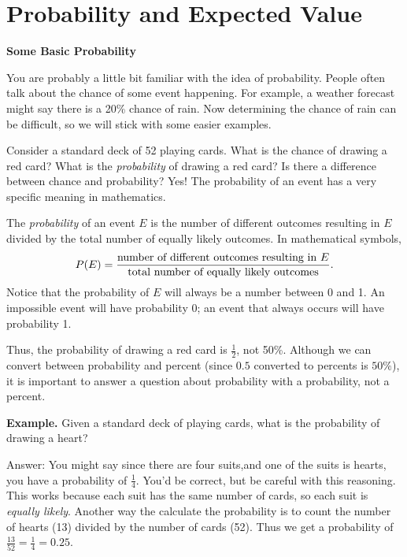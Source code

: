 
\section{Probability and Expected Value}



\noindent
{\bf Some Basic Probability}
\vspace{.1in}

You are probably a little bit familiar with the idea of probability. People often talk about the chance of some event happening. For example, a weather forecast might say there is a 20\% chance of rain. Now determining the chance of rain can be difficult, so we will stick with some easier examples. 

Consider a standard deck of 52 playing cards. What is the chance of drawing a red card? What is the {\it probability} of drawing a red card? Is there a difference between chance and probability? Yes! The probability of an event has a very specific meaning in mathematics. 

The {\it probability} of an event $E$ is the number of different outcomes resulting in $E$ divided by the total number of equally likely outcomes. In mathematical symbols, 
$$P(E)={\mbox{number of different outcomes resulting in $E$}\over \mbox{total number of equally likely outcomes}}.$$
Notice that the probability of $E$ will always be a number between 0 and 1. An impossible event will have probability 0;   an event that always occurs will have probability 1.
\vspace{.1in}

Thus, the probability of drawing a red card is $\frac{1}{2}$, not 50\%. Although we can convert between probability and percent (since $0.5$ converted to percents is $50\%$), it is important to answer a question about probability with a probability, not a percent. 

\vspace{.1in}
{\bf Example.} Given a standard deck of playing cards, what is the probability of drawing a heart? 

\vspace{.1in}
Answer: You might say since there are four suits,and one of the suits is hearts, you have a probability of $\frac{1}{4}$. You'd be correct, but be careful with this reasoning. This works because each suit has the same number of cards, so each suit is {\it equally likely}. Another way the calculate the probability is to count the number of hearts (13) divided by the number of cards (52). Thus we get a probability of $\frac{13}{52}=\frac{1}{4}=0.25$. 

